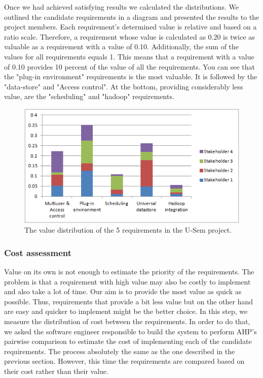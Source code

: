 Once we had achieved satisfying results we calculated the distributions. We outlined the candidate requirements in a diagram and presented the results to the project members. Each requirement's determined value is relative and based on a ratio scale. Therefore, a requirement whose value is calculated as 0.20 is twice as valuable as a requirement with a value of 0.10. Additionally, the sum of the values for all requirements equals 1. This means that a requirement with a value of 0.10 provides 10 percent of the value of all the requirements. You can see that the "plug-in environment" requirements is the most valuable. It is followed by the "data-store" and "Access control". At the bottom, providing considerably less value, are the "scheduling" and "hadoop" requirements.

\begin{figure}[h!]
  \centering
      \includegraphics{requirements/value_diagram.png}
  \caption{The value distribution of the 5 requirements in the U-Sem project.}
\end{figure}

\subsubsection{Cost assessment}

Value on its own is not enough to estimate the priority of the requirements. The problem is that a requirement with high value may also be costly to implement and also take a lot of time. Our aim is to provide the most value as quick as possible. Thus, requirements that provide a bit less value but on the other hand are easy and quicker to implement might be the better choice. In this step, we measure the distribution of cost between the requirements. In order to do that, we asked the software engineer responsible to build the system to perform AHP's pairwise comparison to estimate the cost of implementing each of the candidate requirements. The process absolutely the same as the one described in the previous section. However, this time the requirements are compared based on their cost rather than their value.


